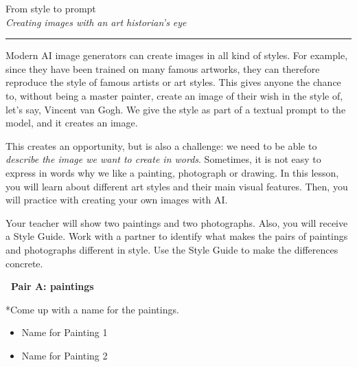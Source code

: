 \documentclass[12pt]{article}
\makeatletter
\newcounter{exercise}
\newcommand{\exercisetitle}[2][]{%
  \refstepcounter{exercise}%
  \vspace{0.5cm}%
  \colorbox{maincolor}{%
    \makebox[\dimexpr\linewidth-2\fboxsep][l]{%
      \textcolor{white}{\faPen\ Assignment \theexercise:~ #2}%
    }%
  }%
  \if\relax\detokenize{#1}\relax\else\label{#1}\fi
  \vspace{0.3cm}%
}
\newcounter{question}
\newlength\questionheight
\newcommand{\question}{\@ifstar{\question@text}{\question@field}}
\newcommand{\question@heading}[1]{%
  \refstepcounter{question}%
  \vspace{0.3cm}%
  \noindent\textbf{\faEdit\ Question \thequestion: #1}%
}
\newcommand{\question@text}[1]{%
  \question@heading{#1}%
}
\newcommand{\question@field}[2][\questionheight]{%
  \question@heading{#2}%
 \\[0.3em] \begin{Form}
    \TextField[
      name=Q\thequestion,
      multiline=true,
      width=\linewidth,
      height=#1,
      charsize=10pt,
      bordercolor={0 0 0},
      borderwidth=1.8,
      backgroundcolor={1 1 1}
    ]{}
  \end{Form}
  \vspace{0.3cm}%
}
\makeatother
\begin{document}
\newpage

\begin{center}
    {\Huge \color{maincolor} From style to prompt}\\[5pt]
    {\large \textit{Creating images with an art historian's eye}}\\
    \rule{\linewidth}{1pt}
\end{center}

\vspace{0.5cm}

Modern AI image generators can create images in all kind of styles. For example, since they have been trained on many famous artworks, they can therefore reproduce the style of famous artists or art styles.
This gives anyone the chance to, without being a master painter, create an image of their wish in the style of, let's say, Vincent van Gogh. We give the style as part of a textual prompt to the model, and it creates an image.

This creates an opportunity, but is also a challenge: we need to be able to \emph{describe the image we want to create in words}. Sometimes, it is not easy to express in words why we like a painting, photograph or drawing. In this lesson, you will learn about different art styles and their main visual features. Then, you will practice with creating your own images with AI.

\exercisetitle[]{Spot the difference}

Your teacher will show two paintings and two photographs. Also, you will receive a Style Guide. Work with a partner to identify what makes the pairs of paintings and photographs different in style. Use the Style Guide to make the differences concrete.

\textcolor{maincolor}{\textbf{\faPen\ Pair A: paintings}}

\question*{Come up with a name for the paintings.} 
\begin{Form}
\begin{itemize}
    \item Name for Painting 1 \\[0.2cm]
\TextField[name=painting1,width=\linewidth,height=0.4cm,multiline=true, bordercolor={0 0 0}]{}
    \item Name for Painting 2\\[0.2cm]
\TextField[name=painting2,width=\linewidth,height=0.4cm,multiline=true, bordercolor={0 0 0}]{}
\end{itemize}
\end{Form}
\end{document}
